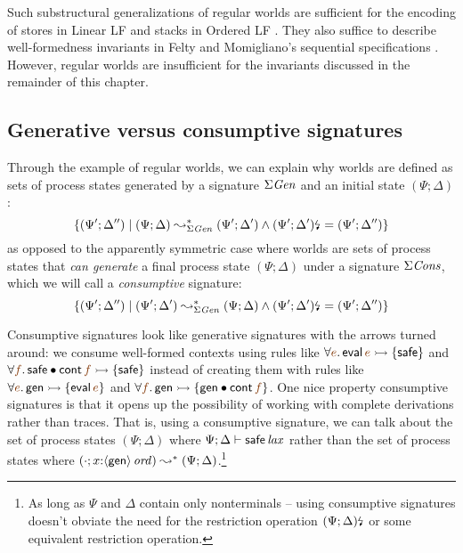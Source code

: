 Such substructural generalizations of regular worlds are sufficient
for the encoding of stores in Linear LF \cite{cervesato02linear} and
stacks in Ordered LF \cite{polakow01ordered}. They also suffice
to describe well-formedness invariants in Felty and Momigliano's
sequential specifications \cite{felty12hybrid}. However, regular
worlds are insufficient for the
invariants discussed in the remainder of this chapter.

\subsection{Generative versus consumptive signatures}

Through the example of regular worlds, we can explain why worlds are
defined as sets of process states generated by a signature
$\Sigma{\it Gen}$ and an initial state $(\Psi; \Delta)$:
\[ 
\{ (\Psi'; \Delta'') \mid
(\Psi; \Delta) \leadsto^*_{\Sigma{\it Gen}} (\Psi'; \Delta') \wedge
{(\Psi'; \Delta')}{\mbox{\lightning}}_{} = (\Psi'; \Delta'') \}
\]
as opposed to the apparently symmetric case where worlds
are sets of process states that {\it can generate} 
a final process state $(\Psi; \Delta)$ under a signature $\Sigma{\it Cons}$,
which we will call a {\it consumptive} signature:
\[ 
\{ (\Psi'; \Delta'') \mid
(\Psi'; \Delta') \leadsto^*_{\Sigma{\it Gen}} (\Psi; \Delta) \wedge
{(\Psi'; \Delta')}{\mbox{\lightning}}_{} = (\Psi'; \Delta'') \}
\]

Consumptive signatures look like generative
signatures with the arrows turned around: we consume well-formed
contexts using rules like $\forall\lf{e}.\,{\sf
  eval}\,\lf{e} \lefti \{ {\sf safe} \}$ and $\forall \lf{f}.\,{\sf
  safe} \fuse {\sf cont}\,\lf{f} \lefti \{ {\sf safe} \}$ instead of
creating them with 
rules like $\forall\lf{e}.\,{\sf gen}\lefti \{ {\sf eval}\,\lf{e} \}$
and $\forall \lf{f}.\,{\sf gen} \lefti \{ {\sf gen} \fuse {\sf
  cont}\,\lf{f} \}$. 
One nice property consumptive signatures is that it opens up the
possibility of working with complete derivations 
rather than traces. That is, using a
consumptive signature, we can talk about the set of process states
$(\Psi; \Delta)$ where $\Psi; \Delta \vdash {{\sf safe}}\,{{\it lax}}$ rather
than the set of process states where $(\cdot; x{:}{\langle {\sf
    gen} \rangle}\,{{\it ord}}) \leadsto^* (\Psi; \Delta)$.\footnote{As long as $\Psi$ and
  $\Delta$ contain only nonterminals -- using consumptive signatures
  doesn't obviate the need for the restriction operation
  ${(\Psi; \Delta)}{\mbox{\lightning}}_{}$ or some equivalent restriction
  operation.} 

